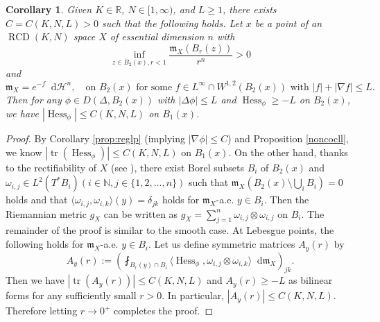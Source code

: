 \documentclass[11pt,reqno]{amsart}
\newtheorem{corollary}[theorem]{Corollary}
\theoremstyle{definition}
\numberwithin{equation}{section}
\newcommand{\dR}{\mathbb{R}}
\newcommand{\di}{\mathop{}\!\mathrm{d}}
\newcommand{\meas}{\mathfrak{m}}
\DeclareMathOperator{\Hess}{Hess}
\DeclareMathOperator{\RCD}{RCD}
\DeclareMathOperator{\tr}{tr}
\newcommand{\haus}{\mathscr{H}}
\begin{document}
\begin{corollary}\label{cor:hessbd}Given $K \in \dR$, $N  \in [1, \infty)$, and $L \geq 1$, there exists $C = C (K, N, L) > 0$
such that the following holds.    Let $x$ be a point of an $\RCD(K, N)$ space $X$ of essential dimension $n$ with
$$
    \inf_{z \in B_2(x), r<1}\frac{\meas_X(B_r(z))}{r^n}>0
$$
and
$$
\meas_X=e^{-f}\di \haus^n,\quad \text{on $B_2(x)$ for some $f \in L^{\infty}\cap W^{1,2}(B_2(x))$ with $|f|+|\nabla f|\le L$.}
$$
Then for any $\phi \in D(\Delta, B_2(x))$ with $|\Delta \phi| \le L$ 
    and $\Hess_{\phi} \ge -L$ on $B_2(x)$, we have
    $
        |\Hess_{\phi}| \le C(K, N, L)$ on $B_1(x)$.

\end{corollary}
\begin{proof}
    By Corollary \ref{prop:reglp} (implying $|\nabla \phi|\le C$) and Proposition \ref{noncocll}, we know
    $
        |\tr  (\Hess_{\phi})|\le C(K, N, L)$ on $B_1(x)$.
    On the other hand, thanks to the rectifiability of $X$ (see \cite{MN}), there exist Borel subsets $B_i$ of $B_2(x)$ and $\omega_{i, j} \in L^2(T^*B_i)(i \in \mathbb{N}, j\in \{1, 2, \ldots, n\})$ such that $\meas_X(B_2(x)\setminus \bigcup_iB_i)=0$ holds and that $\langle \omega_{i, j}, \omega_{i,k}\rangle(y) = \delta_{jk}$ holds for $\meas_X$-a.e. $y \in B_i$. Then the Riemannian metric $g_X$ can be written as $g_X=\sum_{j=1}^n\omega_{i,j}\otimes \omega_{i,j}$ on $B_i$. The remainder of the proof is similar to the smooth case. At Lebesgue points, the following holds for $\meas_X$-a.e. $y \in B_i$.
    Let us define symmetric matrices $A_y(r)$ by
    \begin{equation}
        A_y(r) := \left(\fint_{B_r(y)\cap B_i}\langle \Hess_{\phi}, \omega_{i, j}\otimes \omega_{i, k}\rangle \di \meas_X\right)_{jk}.
    \end{equation}
    Then we have $|\tr  (A_y(r))| \le C(K, N, L)$ and $A_y(r) \ge -L$ as bilinear forms for any sufficiently small $r>0$. In particular, $|A_y(r)|\le C(K, N, L)$.
    Therefore
    letting $r\to 0^+$ completes the proof.
\end{proof}
\end{document}
